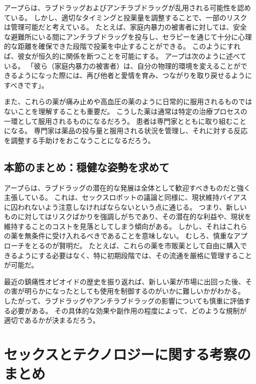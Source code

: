 \documentclass[paper=a4,book,openany]{jlreq} \usepackage{mystyle}
\begin{document}
アープらは、ラブドラッグおよびアンチラブドラッグが乱用される可能性を認めている。
しかし、適切なタイミングと投薬量を調整することで、一部のリスクは管理可能だと考えている。
たとえば、家庭内暴力の被害者に対しては、安全な避難所にいる間にアンチラブドラッグを投与し、セラピーを通じて十分に心理的な距離を確保できた段階で投薬を中止することができる。
このようにすれば、彼女が恒久的に関係を断つことを可能にする。
アープは次のように述べている。
「彼ら（家庭内暴力の被害者）は、自分の物理的環境を変えることができるようになった際には、再び他者と愛情を育み、つながりを取り戻せるようにすべきです」\citep{szalavitz14:_is_it_possib_creat_anti_love_drug}。

また、これらの薬が痛み止めや高血圧の薬のように日常的に服用されるものではないことを理解することも重要だ。
こうした薬は通常は特定の治療プロセスの一環として服用されるものになるだろう。
患者は専門家とともに取り組むことになる。
専門家は薬品の投与量と服用される状況を管理し、それに対する反応を調整する手助けをおこなうことになるだろう。

\subsection{本節のまとめ：穏健な姿勢を求めて}

アープらは、ラブドラッグの潜在的な発展は全体として歓迎すべきものだと強く主張している。
これは、セックスロボットの議論と同様に、現状維持バイアスに囚われないよう注意しなければならないという点に通じる。
つまり、新しいものに対してはリスクばかりを強調しがちであり、その潜在的な利益や、現状を維持することのコストを見落としてしまう傾向がある。
しかし、それはこれらの薬を無条件に受け入れるべきであることを意味しない。
むしろ、慎重なアプローチをとるのが賢明だ。
たとえば、これらの薬を市販薬として自由に購入できるようにする必要はなく、特に初期段階では、その流通を厳格に管理することが可能だ。

最近の鎮痛性オピオイドの歴史を振り返れば、新しい薬が市場に出回った後、その害が明らかになったとしても使用を制御するのがいかに難しいかがわかる。
したがって、ラブドラッグやアンチラブドラッグの影響についても慎重に評価する必要がある。
その具体的な効果や副作用の程度によって、どのような規制が適切であるかが決まるだろう。

\section{セックスとテクノロジーに関する考察のまとめ}
\end{document}
